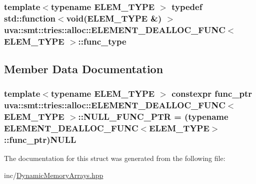 \subsubsection[{func\+\_\+type}]{\setlength{\rightskip}{0pt plus 5cm}template$<$typename E\+L\+E\+M\+\_\+\+T\+Y\+P\+E $>$ typedef std\+::function$<$void(E\+L\+E\+M\+\_\+\+T\+Y\+P\+E \&) $>$ {\bf uva\+::smt\+::tries\+::alloc\+::\+E\+L\+E\+M\+E\+N\+T\+\_\+\+D\+E\+A\+L\+L\+O\+C\+\_\+\+F\+U\+N\+C}$<$ E\+L\+E\+M\+\_\+\+T\+Y\+P\+E $>$\+::{\bf func\+\_\+type}}\label{structuva_1_1smt_1_1tries_1_1alloc_1_1_e_l_e_m_e_n_t___d_e_a_l_l_o_c___f_u_n_c_a46500627bdbbdb00846c63fe5faec2a2}


\subsection{Member Data Documentation}
\hypertarget{structuva_1_1smt_1_1tries_1_1alloc_1_1_e_l_e_m_e_n_t___d_e_a_l_l_o_c___f_u_n_c_ae9312b301dcf1a8016dc2eef0c9b11d3}{}
\subsubsection[{N\+U\+L\+L\+\_\+\+F\+U\+N\+C\+\_\+\+P\+T\+R}]{\setlength{\rightskip}{0pt plus 5cm}template$<$typename E\+L\+E\+M\+\_\+\+T\+Y\+P\+E $>$ constexpr {\bf func\+\_\+ptr} {\bf uva\+::smt\+::tries\+::alloc\+::\+E\+L\+E\+M\+E\+N\+T\+\_\+\+D\+E\+A\+L\+L\+O\+C\+\_\+\+F\+U\+N\+C}$<$ E\+L\+E\+M\+\_\+\+T\+Y\+P\+E $>$\+::N\+U\+L\+L\+\_\+\+F\+U\+N\+C\+\_\+\+P\+T\+R = (typename {\bf E\+L\+E\+M\+E\+N\+T\+\_\+\+D\+E\+A\+L\+L\+O\+C\+\_\+\+F\+U\+N\+C}$<$E\+L\+E\+M\+\_\+\+T\+Y\+P\+E$>$\+::{\bf func\+\_\+ptr})N\+U\+L\+L\hspace{0.3cm}{\ttfamily [static]}}\label{structuva_1_1smt_1_1tries_1_1alloc_1_1_e_l_e_m_e_n_t___d_e_a_l_l_o_c___f_u_n_c_ae9312b301dcf1a8016dc2eef0c9b11d3}


The documentation for this struct was generated from the following file\+:\begin{DoxyCompactItemize}
\item 
inc/\hyperlink{_dynamic_memory_arrays_8hpp}{Dynamic\+Memory\+Arrays.\+hpp}\end{DoxyCompactItemize}
